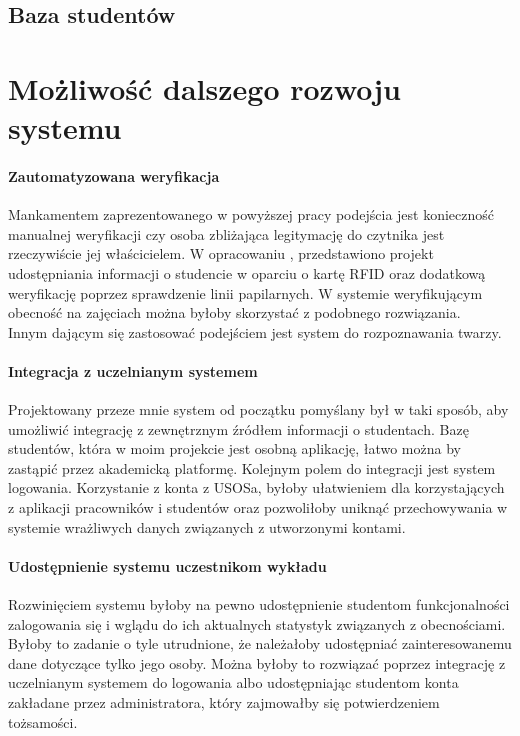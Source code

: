 \documentclass[declaration,shortabstract, mgr]{iithesis}
\begin{document}
\section{Baza studentów}

\chapter{Możliwość dalszego rozwoju systemu}
\subsubsection{Zautomatyzowana weryfikacja}
\indent Mankamentem zaprezentowanego w powyższej pracy podejścia jest konieczność manualnej weryfikacji czy osoba zbliżająca legitymację do czytnika jest rzeczywiście jej właścicielem. W opracowaniu \cite{fingerprint}, przedstawiono projekt udostępniania informacji o studencie w oparciu o kartę RFID oraz dodatkową weryfikację poprzez sprawdzenie linii papilarnych. W systemie weryfikującym obecność na zajęciach można byłoby skorzystać z podobnego rozwiązania.\\
\indent Innym dającym się zastosować podejściem jest system do rozpoznawania twarzy.
\subsubsection{Integracja z uczelnianym systemem}
\indent Projektowany przeze mnie system od początku pomyślany był w taki sposób, aby umożliwić integrację z zewnętrznym źródłem informacji o studentach. Bazę studentów, która w moim projekcie jest osobną aplikację, łatwo można by zastąpić przez akademicką platformę. Kolejnym polem do integracji jest system logowania. Korzystanie z konta z USOSa, byłoby ułatwieniem dla korzystających z aplikacji pracowników i studentów oraz pozwoliłoby uniknąć przechowywania w systemie wrażliwych danych związanych z utworzonymi kontami.
\subsubsection{Udostępnienie systemu uczestnikom wykładu}
\indent Rozwinięciem systemu byłoby na pewno udostępnienie studentom funkcjonalności zalogowania się i wglądu do ich aktualnych statystyk związanych z obecnościami. Byłoby to zadanie o tyle utrudnione, że należałoby udostępniać zainteresowanemu dane dotyczące tylko jego osoby. Można byłoby to rozwiązać poprzez integrację z uczelnianym systemem do logowania albo udostępniając studentom konta zakładane przez administratora, który zajmowałby się potwierdzeniem tożsamości.
\end{document}
